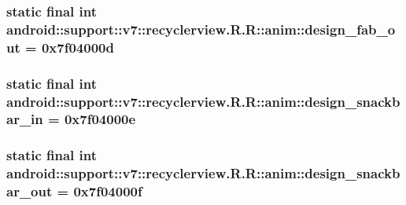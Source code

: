 \hypertarget{classandroid_1_1support_1_1v7_1_1recyclerview_1_1_r_1_1anim_54e899f8204ab6845659503a62a164ba}{
\subsubsection[{design\_\-fab\_\-out}]{\setlength{\rightskip}{0pt plus 5cm}static final int android::support::v7::recyclerview.R.R::anim::design\_\-fab\_\-out = 0x7f04000d}}
\label{classandroid_1_1support_1_1v7_1_1recyclerview_1_1_r_1_1anim_54e899f8204ab6845659503a62a164ba}


\hypertarget{classandroid_1_1support_1_1v7_1_1recyclerview_1_1_r_1_1anim_9c5ed7bd3c8dc741994a8259c291d3d1}{
\subsubsection[{design\_\-snackbar\_\-in}]{\setlength{\rightskip}{0pt plus 5cm}static final int android::support::v7::recyclerview.R.R::anim::design\_\-snackbar\_\-in = 0x7f04000e}}
\label{classandroid_1_1support_1_1v7_1_1recyclerview_1_1_r_1_1anim_9c5ed7bd3c8dc741994a8259c291d3d1}


\hypertarget{classandroid_1_1support_1_1v7_1_1recyclerview_1_1_r_1_1anim_7d6c9c7b2556257d3e23d75b0a296d82}{
\subsubsection[{design\_\-snackbar\_\-out}]{\setlength{\rightskip}{0pt plus 5cm}static final int android::support::v7::recyclerview.R.R::anim::design\_\-snackbar\_\-out = 0x7f04000f}}
\label{classandroid_1_1support_1_1v7_1_1recyclerview_1_1_r_1_1anim_7d6c9c7b2556257d3e23d75b0a296d82}




